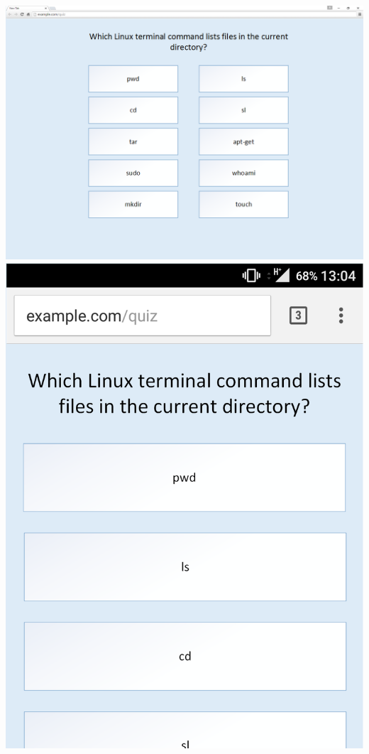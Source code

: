 \documentclass{article}
\begin{document}
\begin{center}
	\includegraphics[width=\textwidth]{Quiz-Web-Design-Cropped}\\
	\vspace{1cm}
	\includegraphics[scale=0.25]{Quiz-Mobile-Cropped}
\end{center}
\end{document}
